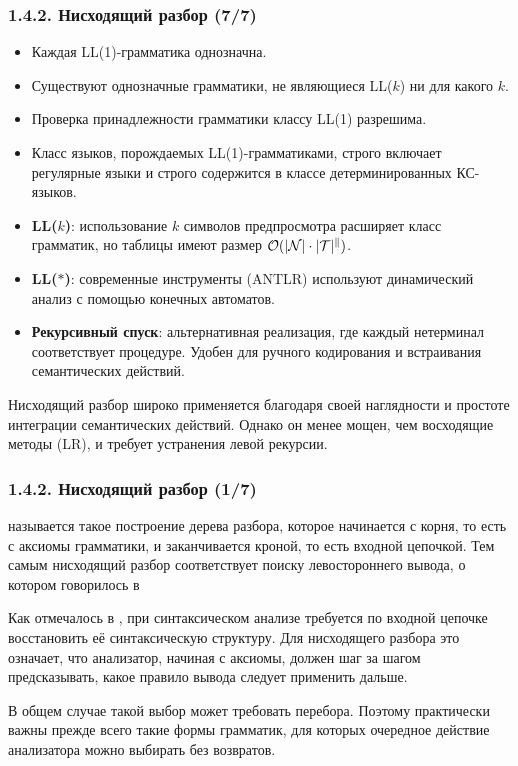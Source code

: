 \begin{frame}
\frametitle{1.4.2. Нисходящий разбор (7/7)}

\begin{itemize}
    \item Каждая LL(1)-грамматика однозначна.
    \item Существуют однозначные грамматики, не являющиеся LL($k$) ни для какого $k$.
    \item Проверка принадлежности грамматики классу LL(1) разрешима.
    \item Класс языков, порождаемых LL(1)-грамматиками, строго включает регулярные языки и строго содержится в классе детерминированных КС-языков.
\end{itemize}


\begin{itemize}
    \item \textbf{LL($k$)}: использование $k$ символов предпросмотра расширяет класс грамматик, но таблицы имеют размер $\cal{O}(|N| \cdot |T|^k)$.
    \item \textbf{LL($*$)}: современные инструменты (ANTLR) используют динамический анализ с помощью конечных автоматов.
    \item \textbf{Рекурсивный спуск}: альтернативная реализация, где каждый нетерминал соответствует процедуре. Удобен для ручного кодирования и встраивания семантических действий.
\end{itemize}

\begin{digress}
Нисходящий разбор широко применяется благодаря своей наглядности и простоте интеграции семантических действий. Однако он менее мощен, чем восходящие методы (LR), и требует устранения левой рекурсии.
\end{digress}

\end{frame}

\begin{frame}
\frametitle{1.4.2. Нисходящий разбор (1/7)}

 называется такое построение дерева
разбора, которое начинается с корня, то есть с аксиомы грамматики, и заканчивается
кроной, то есть входной цепочкой. Тем самым нисходящий разбор соответствует поиску
левостороннего вывода, о котором говорилось в 

Как отмечалось в , при синтаксическом анализе требуется по
входной цепочке восстановить её синтаксическую структуру. Для нисходящего разбора
это означает, что анализатор, начиная с аксиомы, должен шаг за шагом предсказывать,
какое правило вывода следует применить дальше.

В общем случае такой выбор может требовать перебора. Поэтому практически важны прежде
всего такие формы грамматик, для которых очередное действие анализатора можно
выбирать без возвратов.

\end{frame}

